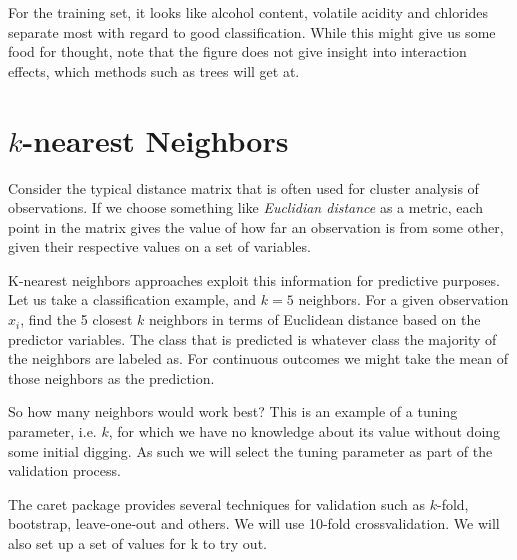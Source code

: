 \begin{knitrout}\footnotesize
{}\color{fgcolor}
\end{knitrout}


For the training set, it looks like alcohol content, volatile acidity and chlorides separate most with regard to good classification. While this might give us some food for thought, note that the figure does not give insight into interaction effects, which methods such as trees will get at.

\section{$k$-nearest Neighbors}
Consider the typical distance matrix that is often used for cluster analysis of observations. If we choose something like \emph{Euclidian distance} as a metric, each point in the matrix gives the value of how far an observation is from some other, given their respective values on a set of variables.

K-nearest neighbors approaches exploit this information for predictive purposes.  Let us take a classification example, and $k = 5$ neighbors.  For a given observation $x_i$, find the 5 closest $k$ neighbors in terms of Euclidean distance based on the predictor variables.  The class that is predicted is whatever class the majority of the neighbors are labeled as.  For continuous outcomes we might take the mean of those neighbors as the prediction.

So how many neighbors would work best? This is an example of a tuning parameter, i.e. $k$, for which we have no knowledge about its value without doing some initial digging.  As such we will select the tuning parameter as part of the validation process.

The caret package provides several techniques for validation such as $k$-fold, bootstrap, leave-one-out and others.  We will use 10-fold crossvalidation.  We will also set up a set of values for k to try out.



















